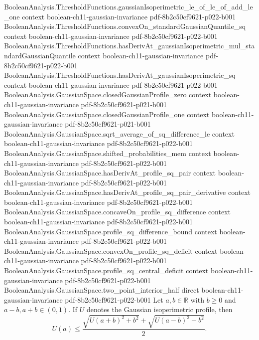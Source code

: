 \begin{lemma}
\proofstep
  {BooleanAnalysis.ThresholdFunctions.gaussianIsoperimetric_le_of_le_of_add_le_one}
  {context}
  {boolean-ch11-gaussian-invariance}
  {pdf-8b2c50cf9621-p022-b001}
\proofstep
  {BooleanAnalysis.ThresholdFunctions.convexOn_standardGaussianQuantile_sq}
  {context}
  {boolean-ch11-gaussian-invariance}
  {pdf-8b2c50cf9621-p022-b001}
\proofstep
  {BooleanAnalysis.ThresholdFunctions.hasDerivAt_gaussianIsoperimetric_mul_standardGaussianQuantile}
  {context}
  {boolean-ch11-gaussian-invariance}
  {pdf-8b2c50cf9621-p022-b001}
\proofstep
  {BooleanAnalysis.ThresholdFunctions.hasDerivAt_gaussianIsoperimetric_sq}
  {context}
  {boolean-ch11-gaussian-invariance}
  {pdf-8b2c50cf9621-p022-b001}
\proofstep
  {BooleanAnalysis.GaussianSpace.closedGaussianProfile_zero}
  {context}
  {boolean-ch11-gaussian-invariance}
  {pdf-8b2c50cf9621-p021-b001}
\proofstep
  {BooleanAnalysis.GaussianSpace.closedGaussianProfile_one}
  {context}
  {boolean-ch11-gaussian-invariance}
  {pdf-8b2c50cf9621-p021-b001}
\proofstep
  {BooleanAnalysis.GaussianSpace.sqrt_average_of_sq_difference_le}
  {context}
  {boolean-ch11-gaussian-invariance}
  {pdf-8b2c50cf9621-p022-b001}
\proofstep
  {BooleanAnalysis.GaussianSpace.shifted_probabilities_mem}
  {context}
  {boolean-ch11-gaussian-invariance}
  {pdf-8b2c50cf9621-p022-b001}
\proofstep
  {BooleanAnalysis.GaussianSpace.hasDerivAt_profile_sq_pair}
  {context}
  {boolean-ch11-gaussian-invariance}
  {pdf-8b2c50cf9621-p022-b001}
\proofstep
  {BooleanAnalysis.GaussianSpace.hasDerivAt_profile_sq_pair_derivative}
  {context}
  {boolean-ch11-gaussian-invariance}
  {pdf-8b2c50cf9621-p022-b001}
\proofstep
  {BooleanAnalysis.GaussianSpace.concaveOn_profile_sq_difference}
  {context}
  {boolean-ch11-gaussian-invariance}
  {pdf-8b2c50cf9621-p022-b001}
\proofstep
  {BooleanAnalysis.GaussianSpace.profile_sq_difference_bound}
  {context}
  {boolean-ch11-gaussian-invariance}
  {pdf-8b2c50cf9621-p022-b001}
\proofstep
  {BooleanAnalysis.GaussianSpace.convexOn_profile_sq_deficit}
  {context}
  {boolean-ch11-gaussian-invariance}
  {pdf-8b2c50cf9621-p022-b001}
\proofstep
  {BooleanAnalysis.GaussianSpace.profile_sq_central_deficit}
  {context}
  {boolean-ch11-gaussian-invariance}
  {pdf-8b2c50cf9621-p022-b001}
\proofstep
  {BooleanAnalysis.GaussianSpace.two_point_interior_half}
  {direct}
  {boolean-ch11-gaussian-invariance}
  {pdf-8b2c50cf9621-p022-b001}
Let $a,b\in\mathbb R$ with $b\ge0$ and $a-b,a+b\in(0,1)$. If $U$ denotes the Gaussian
isoperimetric profile, then
\[
U(a)\le\frac{\sqrt{U(a+b)^2+b^2}+\sqrt{U(a-b)^2+b^2}}{2}.
\]
\end{lemma}

